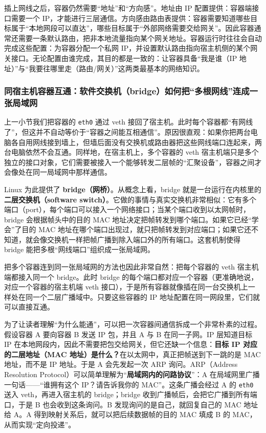 插上网线之后，容器仍然需要“地址”和“方向感”。地址由 IP 配置提供：容器端接口需要一个 IP，才能进行三层通信。方向感由路由表提供：容器需要知道哪些目标属于“本地网段可以直达”，哪些目标属于“外部网络需要交给网关”。因此容器通常还需要一条默认路由，把非本地流量指向某个网关地址。容器运行时往往会自动完成这些配置：为容器分配一个私网 IP，并设置默认路由指向宿主机侧的某个网关接口。无论配置由谁完成，其目的都是一致的：让容器具备“我是谁（IP 地址）”与“我要往哪里走（路由/网关）”这两类最基本的网络知识。


\subsubsection{同宿主机容器互通：软件交换机（bridge）如何把“多根网线”连成一张局域网}

上一小节我们把容器的 \texttt{eth0} 通过 veth 接回了宿主机。此时每个容器都“有网线了”，但这并不自动等价于“容器之间能互相通信”。原因很直观：如果你把两台电脑各自用网线接到墙上，但墙后面没有交换机或路由器把这些网线端口连起来，两台电脑依然不会互通。同样地，在宿主机上，多个容器的 veth 宿主机端只是多个独立的接口对象，它们需要被接入一个能够转发二层帧的“汇聚设备”，容器之间才会像处在同一局域网中那样通信。

Linux 为此提供了 \textbf{bridge（网桥）}。从概念上看，bridge 就是一台运行在内核里的\textbf{二层交换机（software switch）}。它做的事情与真实交换机非常相似：它有多个端口（port），每个端口可以接入一个网络接口；当某个端口收到以太网帧时，bridge 会根据帧头中的目的 MAC 地址决定把帧转发到哪个端口。如果它已经“学会”了目的 MAC 地址在哪个端口出现过，就只把帧转发到对应端口；如果它还不知道，就会像交换机一样把帧广播到除入端口外的所有端口。这套机制使得 bridge 能把多根“网线端口”组织成一张局域网。

把多个容器连到同一张局域网的方法也因此非常自然：把每个容器的 veth 宿主机端都接入同一个 bridge。此时 bridge 的每个端口都对应一个容器（更准确地说，对应一个容器的宿主机端 veth 接口），于是所有容器就像插在同一台交换机上一样处在同一个二层广播域中。只要这些容器的 IP 地址配置在同一网段里，它们就可以直接互通。

为了让读者理解“为什么能通”，可以把一次容器间通信拆成一个非常朴素的过程。假设容器 A 要向容器 B 发送 IP 包，并且 A 与 B 在同一子网。IP 层知道目标 IP 在本地网段内，因此不需要把包交给网关，但它还缺一个信息：\textbf{目标 IP 对应的二层地址（MAC 地址）是什么？}在以太网中，真正把帧送到下一跳的是 MAC 地址，而不是 IP 地址。于是 A 会先发起一次 ARP 询问。ARP（Address Resolution Protocol）可以简单理解为“\textbf{局域网内的问路协议}”：A 在局域网里广播一句话——“谁拥有这个 IP？请告诉我你的 MAC”。这条广播会经过 A 的 \texttt{eth0} 送入 veth，再进入宿主机的 bridge；bridge 收到广播帧后，会把它广播到所有端口，于是 B 也会收到这条询问。B 发现询问的是自己，就回复自己的 MAC 地址给 A。A 得到映射关系后，就可以把后续数据帧的目的 MAC 填成 B 的 MAC，从而实现“定向投递”。

